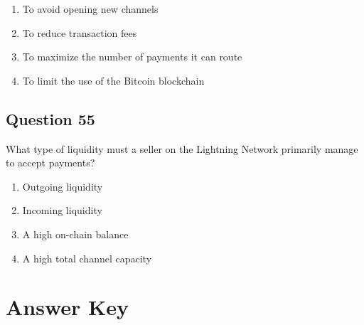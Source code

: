 \documentclass[12pt,a4paper]{article}
\begin{document}
\begin{enumerate}[label=\Alph*., leftmargin=*]
\item To avoid opening new channels
\item To reduce transaction fees
\item To maximize the number of payments it can route
\item To limit the use of the Bitcoin blockchain
\end{enumerate}

\bigskip


\subsection*{Question 55}
What type of liquidity must a seller on the Lightning Network primarily manage to accept payments?

\begin{enumerate}[label=\Alph*., leftmargin=*]
\item Outgoing liquidity
\item Incoming liquidity
\item A high on-chain balance
\item A high total channel capacity
\end{enumerate}

\bigskip


\newpage
\section*{Answer Key}
\end{document}
